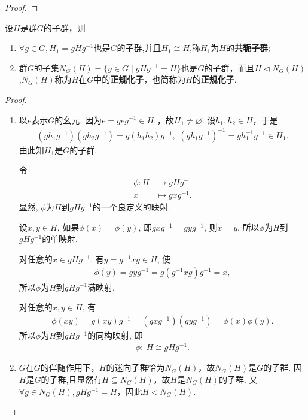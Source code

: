 \documentclass[../../main.tex]{subfiles}%
\begin{document}
\begin{proof}
\end{proof}

\begin{theorem}\label{theorem:共轭子群和正规化子}
设$H$是群$G$的子群，则
\begin{enumerate}[(1)]
\item $\forall g \in G, H_1 = gHg^{-1}$也是$G$的子群,并且$H_1\cong H$,称$H_1$为$H$的\textbf{共轭子群};

\item 群$G$的子集$N_G(H) = \{g \in G \mid gHg^{-1} = H\}$也是$G$的子群，而且$H \lhd N_G(H)$,$N_G(H)$称为$H$在$G$中的\textbf{正规化子}，也简称为$H$的\textbf{正规化子}.
\end{enumerate}
\end{theorem}
\begin{proof}
\begin{enumerate}[(1)]
\item 以$e$表示$G$的幺元. 因为$e = geg^{-1} \in H_1$，故$H_1 \neq \varnothing$. 设$h_1, h_2 \in H$，于是
\begin{align*}
(gh_1g^{-1})(gh_2g^{-1}) = g(h_1h_2)g^{-1},\,\,(gh_1g^{-1})^{-1} = gh_1^{-1}g^{-1} \in H_1.
\end{align*}
由此知$H_1$是$G$的子群.

令
\begin{align*}
\phi: H &\to gHg^{-1} \\
x &\mapsto gxg^{-1}.
\end{align*}
显然, $\phi$为$H$到$gHg^{-1}$的一个良定义的映射.

设$x,y\in H$, 如果$\phi(x)=\phi(y)$, 即$gxg^{-1}=gyg^{-1}$, 则$x=y$, 所以$\phi$为$H$到$gHg^{-1}$的单映射.

对任意的$x\in gHg^{-1}$, 有$y=g^{-1}xg\in H$, 使
\begin{align*}
\phi(y) = gyg^{-1} = g(g^{-1}xg)g^{-1} = x,
\end{align*}
所以$\phi$为$H$到$gHg^{-1}$满映射.

对任意的$x,y\in H$, 有
\begin{align*}
\phi(xy) = g(xy)g^{-1} = (gxg^{-1})(gyg^{-1}) = \phi(x)\phi(y).
\end{align*}
所以$\phi$为$H$到$gHg^{-1}$的同构映射, 即
\begin{align*}
\phi: \ H \cong gHg^{-1}.
\end{align*}

\item $G$在$G$的伴随作用下，$H$的迷向子群恰为$N_G(H)$，故$N_G(H)$是$G$的子群. 因$H$是$G$的子群,且显然有$H \subseteq N_G(H)$，故$H$是$N_G(H)$的子群. 又$\forall g \in N_G(H), gHg^{-1} = H$，因此$H \lhd N_G(H)$.
\end{enumerate}

\end{proof}
\end{document}

